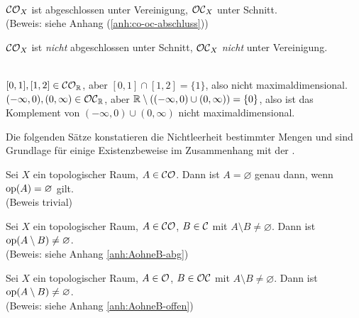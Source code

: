 %
    \begin{satz}\label{kor:co-oc-abschluss}\ \\
        $\mathcal{CO}_X$ ist abgeschlossen unter Vereinigung, $\mathcal{OC}_X$ unter Schnitt.\\
        (Beweis: siehe Anhang (\ref{anh:co-oc-abschluss}))
    \end{satz}
%
%    
    \begin{bem}
    $\mathcal{CO}_X$ ist \textit{nicht} abgeschlossen unter Schnitt, $\mathcal{OC}_X$ \textit{nicht} unter Vereinigung.
    \end{bem}
%
    \begin{gegenbsp}\ \\
    ${[0,1], [1,2] \in \mathcal{CO}_{\mathbb{R}}}$, aber ${[0,1] \cap [1,2] = \{1\}}$, also nicht maximaldimensional.\\
    ${(-\infty,0), (0,\infty) \in \mathcal{OC}_{\mathbb{R}}}$, aber ${\mathbb{R} \setminus ((-\infty,0) \cup (0,\infty)) = \{0\}}$, also ist das Komplement von ${(-\infty,0) \cup (0,\infty)}$ nicht maximaldimensional.
    \end{gegenbsp}
%
%
%
    Die folgenden Sätze konstatieren die Nichtleerheit bestimmter Mengen und sind Grundlage für einige Existenzbeweise im Zusammenhang mit der \strukt.
%
    \begin{satz}\label{satz:Aleer}
        Sei $X$ ein topologischer Raum, $A \in \mathcal{CO}$. Dann ist $A = \varnothing$ genau dann, wenn $\text{op}(A) = \varnothing$ gilt.\\
        (Beweis trivial)
    \end{satz}
%
%
    \begin{satz}\label{satz:AohneB-abg}
        Sei $X$ ein topologischer Raum, $A \in \mathcal{CO}$, $B \in \mathcal{C}$ mit $A \setminus B \neq \varnothing$. Dann ist $\text{op}(A \setminus B) \neq \varnothing$.\\
        (Beweis: siehe Anhang \ref{anh:AohneB-abg})
    \end{satz}
%    
%    
    \begin{satz}\label{satz:AohneB-offen}
        Sei $X$ ein topologischer Raum, $A \in \mathcal{O}$, $B \in \mathcal{OC}$ mit $A \setminus B \neq \varnothing$. Dann ist $\text{op}(A \setminus B) \neq \varnothing$.\\
        (Beweis: siehe Anhang \ref{anh:AohneB-offen})
    \end{satz}

